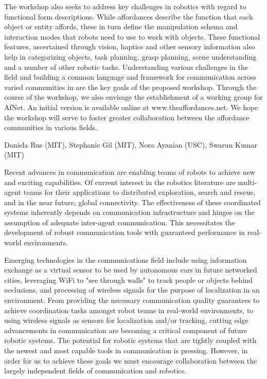 \begin{spacing}{1.0}
{The workshop also seeks to address key challenges in robotics with regard to functional form descriptions. While affordances describe the function that each object or entity affords, these in turn define the manipulation schema and interaction modes that robots need to use to work with objects. These functional features, ascertained through vision, haptics and other sensory information also help in categorizing objects, task planning, grasp planning, scene understanding and a number of other robotic tasks. Understanding various challenges in the field and building a common language and framework for communication across varied communities in are the key goals of the proposed workshop. Through the course of the workshop, we also envisage the establishment of a working group for AfNet. An initial version is available online at www.theaffordances.net. We hope the workshop will serve to foster greater collaboration between the affordance communities in various fields.
}


{Daniela Rus (MIT), Stephanie Gil (MIT), Nora Ayanian (USC), Swarun Kumar (MIT)}
{
Recent advances in communication are enabling teams of robots to achieve new and exciting capabilities. Of current interest in the robotics literature are multi-agent teams for their applications to distributed exploration, search and rescue, and in the near future, global connectivity. The effectiveness of these coordinated systems inherently depends on communication infrastructure and hinges on the assumption of adequate inter-agent communication. This necessitates the development of robust communication tools with guaranteed performance in real-world environments.

Emerging technologies in the communications field include using information exchange as a virtual sensor to be used by autonomous cars in future networked cities, leveraging WiFi to "see through walls" to track people or objects behind occlusions, and processing of wireless signals for the purpose of localization in an environment. From providing the necessary communication quality guarantees to achieve coordination tasks amongst robot teams in real-world environments, to using wireless signals as sensors for localization and/or tracking, cutting edge advancements in communication are becoming a critical component of future robotic systems. The potential for robotic systems that are tightly coupled with the newest and most capable tools in communication is pressing. However, in order for us to achieve these goals we must encourage collaboration between the largely independent fields of communication and robotics.

}
\end{spacing}
